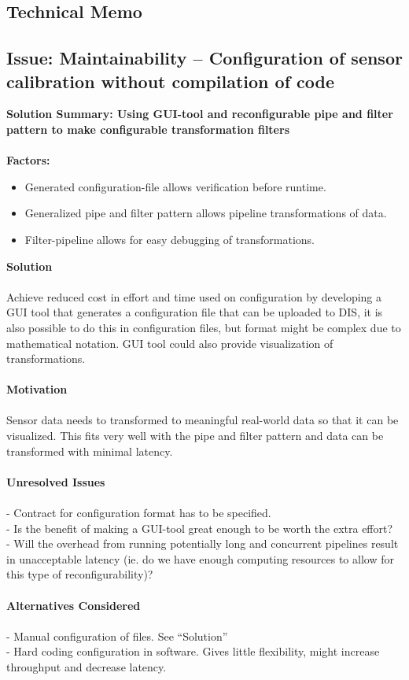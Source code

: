 \subsection*{Technical Memo}
\subsection{Issue: Maintainability -- Configuration of sensor calibration without compilation of code}
\textbf{Solution Summary: Using GUI-tool and reconfigurable pipe and filter
pattern to make configurable transformation filters\\
\\
Factors:}
\begin{itemize}
\item Generated configuration-file allows verification before runtime.
\item Generalized pipe and filter pattern allows pipeline transformations of
data.
\item Filter-pipeline allows for easy debugging of transformations.
\end{itemize}
\textbf{Solution}\\
\\
Achieve reduced cost in effort and time used on configuration by developing a
GUI tool that generates a configuration file that can be uploaded to DIS, it is
also possible to do this in configuration files, but format might be complex
due to mathematical notation. GUI tool could also provide visualization of
transformations.\\
\\
\textbf{Motivation}\\
\\
Sensor data needs to transformed to meaningful real-world data so that it can
be visualized. This fits very well with the pipe and filter pattern and data
can be transformed with minimal latency.\\
\\
\textbf{Unresolved Issues}\\
\\
- Contract for configuration format has to be specified.\\
- Is the benefit of making a GUI-tool great enough to be worth the extra
effort?\\
- Will the overhead from running potentially long and concurrent pipelines
result in unacceptable latency (ie. do we have enough computing resources to
allow for this type of reconfigurability)?\\
\\
\textbf{Alternatives Considered}\\
\\
- Manual configuration of files. See ``Solution''\\
- Hard coding configuration in software. Gives little flexibility,
might increase throughput and decrease latency. \\


